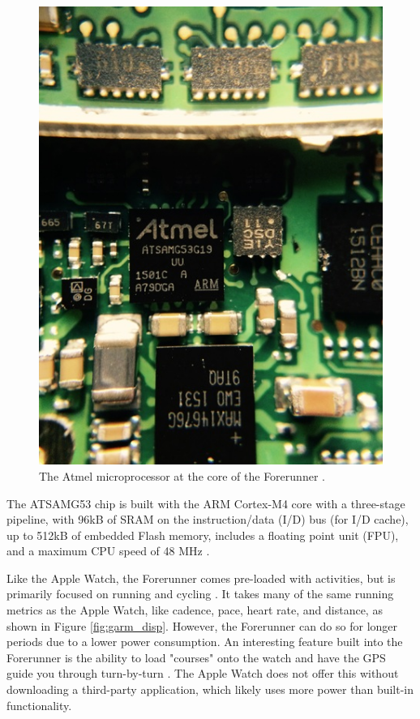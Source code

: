 \begin{figure}[h]
    \centering
    \includegraphics[scale=0.6]{media/garmin_teardown.jpg}
    \caption{The Atmel microprocessor at the core of the Forerunner \cite{forerunner_teardown}.}
    \label{fig:garmTear}
\end{figure}

The ATSAMG53 chip is built with the ARM Cortex-M4 core with a three-stage pipeline,
with 96kB of SRAM on the instruction/data (I/D) bus (for I/D cache), 
up to 512kB of embedded Flash memory, includes a floating point unit 
(FPU), and a maximum CPU speed of 48 MHz \cite{atmel_specs}.

Like the Apple Watch, the Forerunner comes pre-loaded with activities, but is primarily focused on
running and cycling \cite{garmin_price}. It takes many of the same running metrics as the Apple Watch,
like cadence, pace, heart rate, and distance, as shown in Figure \ref{fig:garm_disp}. 
However, the Forerunner can do so for longer periods due to a lower power consumption.
An interesting feature built into the Forerunner is the ability to load "courses" onto the watch and have
the GPS guide you through turn-by-turn \cite{garmin_course}. The Apple Watch does not offer this without downloading a third-party
application, which likely uses more power than built-in functionality.

